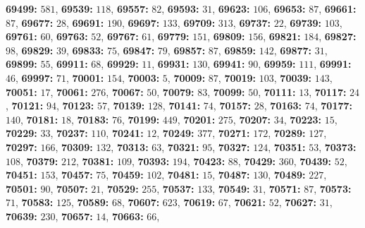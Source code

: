 \textsf{\bfseries 69499:} $581$, \textsf{\bfseries 69539:} $118$, \textsf{\bfseries 69557:} $82$, \textsf{\bfseries 69593:} $31$, \textsf{\bfseries 69623:} $106$, \textsf{\bfseries 69653:} $87$, \textsf{\bfseries 69661:} $87$, \textsf{\bfseries 69677:} $28$, \textsf{\bfseries 69691:} $190$, \textsf{\bfseries 69697:} $133$, \textsf{\bfseries 69709:} $313$, \textsf{\bfseries 69737:} $22$, \textsf{\bfseries 69739:} $103$, \textsf{\bfseries 69761:} $60$, \textsf{\bfseries 69763:} $52$, \textsf{\bfseries 69767:} $61$, \textsf{\bfseries 69779:} $151$, \textsf{\bfseries 69809:} $156$, \textsf{\bfseries 69821:} $184$, \textsf{\bfseries 69827:} $98$, \textsf{\bfseries 69829:} $39$, \textsf{\bfseries 69833:} $75$, \textsf{\bfseries 69847:} $79$, \textsf{\bfseries 69857:} $87$, \textsf{\bfseries 69859:} $142$, \textsf{\bfseries 69877:} $31$, \textsf{\bfseries 69899:} $55$, \textsf{\bfseries 69911:} $68$, \textsf{\bfseries 69929:} $11$, \textsf{\bfseries 69931:} $130$, \textsf{\bfseries 69941:} $90$, \textsf{\bfseries 69959:} $111$, \textsf{\bfseries 69991:} $46$, \textsf{\bfseries 69997:} $71$, \textsf{\bfseries 70001:} $154$, \textsf{\bfseries 70003:} $5$, \textsf{\bfseries 70009:} $87$, \textsf{\bfseries 70019:} $103$, \textsf{\bfseries 70039:} $143$, \textsf{\bfseries 70051:} $17$, \textsf{\bfseries 70061:} $276$, \textsf{\bfseries 70067:} $50$, \textsf{\bfseries 70079:} $83$, \textsf{\bfseries 70099:} $50$, \textsf{\bfseries 70111:} $13$, \textsf{\bfseries 70117:} $24$, \textsf{\bfseries 70121:} $94$, \textsf{\bfseries 70123:} $57$, \textsf{\bfseries 70139:} $128$, \textsf{\bfseries 70141:} $74$, \textsf{\bfseries 70157:} $28$, \textsf{\bfseries 70163:} $74$, \textsf{\bfseries 70177:} $140$, \textsf{\bfseries 70181:} $18$, \textsf{\bfseries 70183:} $76$, \textsf{\bfseries 70199:} $449$, \textsf{\bfseries 70201:} $275$, \textsf{\bfseries 70207:} $34$, \textsf{\bfseries 70223:} $15$, \textsf{\bfseries 70229:} $33$, \textsf{\bfseries 70237:} $110$, \textsf{\bfseries 70241:} $12$, \textsf{\bfseries 70249:} $377$, \textsf{\bfseries 70271:} $172$, \textsf{\bfseries 70289:} $127$, \textsf{\bfseries 70297:} $166$, \textsf{\bfseries 70309:} $132$, \textsf{\bfseries 70313:} $63$, \textsf{\bfseries 70321:} $95$, \textsf{\bfseries 70327:} $124$, \textsf{\bfseries 70351:} $53$, \textsf{\bfseries 70373:} $108$, \textsf{\bfseries 70379:} $212$, \textsf{\bfseries 70381:} $109$, \textsf{\bfseries 70393:} $194$, \textsf{\bfseries 70423:} $88$, \textsf{\bfseries 70429:} $360$, \textsf{\bfseries 70439:} $52$, \textsf{\bfseries 70451:} $153$, \textsf{\bfseries 70457:} $75$, \textsf{\bfseries 70459:} $102$, \textsf{\bfseries 70481:} $15$, \textsf{\bfseries 70487:} $130$, \textsf{\bfseries 70489:} $227$, \textsf{\bfseries 70501:} $90$, \textsf{\bfseries 70507:} $21$, \textsf{\bfseries 70529:} $255$, \textsf{\bfseries 70537:} $133$, \textsf{\bfseries 70549:} $31$, \textsf{\bfseries 70571:} $87$, \textsf{\bfseries 70573:} $71$, \textsf{\bfseries 70583:} $125$, \textsf{\bfseries 70589:} $68$, \textsf{\bfseries 70607:} $623$, \textsf{\bfseries 70619:} $67$, \textsf{\bfseries 70621:} $52$, \textsf{\bfseries 70627:} $31$, \textsf{\bfseries 70639:} $230$, \textsf{\bfseries 70657:} $14$, \textsf{\bfseries 70663:} $66$, 

